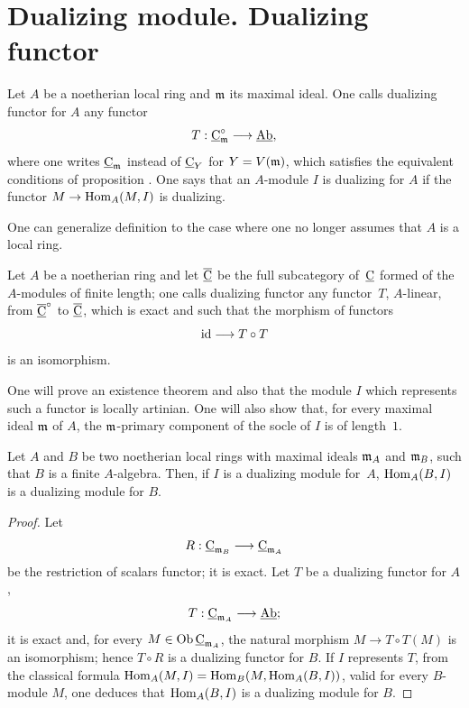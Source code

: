 \section{Dualizing module. Dualizing functor} \label{IV.4}

\begin{definition} \label{IV.4.1}
Let $A$ be a noetherian local ring and $\mathfrak{m}$ its maximal ideal. One calls dualizing functor for $A$ any functor
$$
T:\ccat^{\circ}_\mm\to \Ab,
$$
where one writes $\underline{\mathrm{C}}_{\mathfrak{m}}$ instead of $\underline{\mathrm{C}}_{Y}$ for $Y=V(\mathfrak{m})$, which satisfies the equivalent conditions of proposition . One says that an $A$-module $I$ is dualizing for $A$ if the functor $M\to \Hom_{A}(M, I)$ is dualizing.
\end{definition}

One can generalize definition  to the case where one no longer assumes that $A$ is a local ring.

\begin{definition} \label{IV.4.2}
Let $A$ be a noetherian ring and let $\overline{\underline{\mathrm{C}}}$ be the full subcategory of~$\underline{\mathrm{C}}$ formed of the $A$-modules of finite length; one calls dualizing functor any functor~$T$, $A$-linear, from $\overline{\underline{\mathrm{C}}}^{\circ}$ to $\overline{\underline{\mathrm{C}}}$, which is exact and such that the morphism of functors
$$
\id \to T\circ T
$$
is an isomorphism.
\end{definition}

One will prove an existence theorem and also that the module $I$ which represents such a functor is locally artinian. One will also show that, for every maximal ideal $\mathfrak{m}$ of $A$, the $\mathfrak{m}$-primary component of the socle of $I$ is of length~$1$.

\begin{proposition} \label{IV.4.3}
Let $A$ and $B$ be two noetherian local rings with maximal ideals $\mathfrak{m}_{A}$ and $\mathfrak{m}_{B}$, such that $B$ is a finite $A$-algebra. Then, if $I$ is a dualizing module for~$A$, $\operatorname{Hom}_{A}(B, I)$ is a dualizing module for $B$.
\end{proposition}

\begin{proof}
Let
$$
R: \ccat_{\mm_{B}}\to \ccat_{\mm_{A}}
$$
be the restriction of scalars functor; it is exact. Let $T$ be a dualizing functor for $A$,
$$
T: \ccat_{\mm_{A}}\to \Ab;
$$
it is exact and, for every $M\in \operatorname{Ob} \underline{\mathrm{C}}_{\mathfrak{m}_{A}}$, the natural morphism $M\to T\circ T(M)$ is an isomorphism; hence $T\circ R$ is a dualizing functor for $B$. If $I$ represents $T$, from the classical formula $\operatorname{Hom}_{A}(M, I)=\operatorname{Hom}_{B}(M, \operatorname{Hom}_{A}(B, I))$, valid for every $B$-module $M$, one deduces that $\operatorname{Hom}_{A}(B, I)$ is a dualizing module for $B$.
\skipqed
\end{proof}

